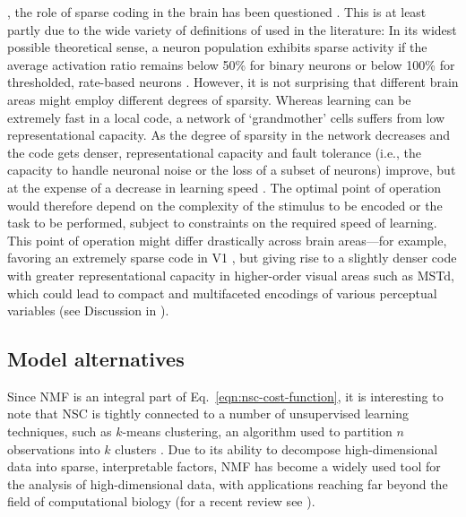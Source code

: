 , the role of sparse coding in the brain has been questioned
\cite{SpanneJorntell2015,BarthPoulet2012}.
This is at least partly due to the wide variety of definitions of 
used in the literature:
In its widest possible theoretical sense,
a neuron population exhibits sparse activity if the average activation ratio
remains below 50\% for binary neurons 
or below 100\% for thresholded,
rate-based neurons \cite{SpanneJorntell2015}.
However, it is not surprising that different brain areas might employ
different degrees of sparsity.
Whereas learning can be extremely fast in a local code,
a network of `grandmother' cells suffers from low representational capacity.
As the degree of sparsity in the network decreases and the code gets denser,
representational capacity and fault tolerance 
(i.e., the capacity to handle neuronal noise or the loss of a subset of neurons)
improve,
but at the expense of a decrease in learning speed
\cite{Foldiak1990,SpanneJorntell2015}.
The optimal point of operation would therefore depend on the complexity of
the stimulus to be encoded or the task to be performed,
subject to constraints on the required speed of learning.
This point of operation might differ drastically across brain areas---for example,
favoring an extremely sparse code in \ac{V1}
\cite{OlshausenField1996},
but giving rise to a slightly denser code with 
greater representational capacity in higher-order visual areas
such as \ac{MSTd}, 
which could lead to compact and multifaceted encodings
of various perceptual variables
(see Discussion in \cite{Beyeler2016}).


\subsection*{Model alternatives}

Since \ac{NMF} is an integral part 
of Eq.~\ref{eqn:nsc-cost-function},
it is interesting to note that \ac{NSC} is tightly connected
to a number of unsupervised learning techniques,
such as $k$-means clustering,
an algorithm used to partition
$n$ observations into $k$ clusters
\cite{Ding2005}.
Due to its ability to decompose high-dimensional data into
sparse, interpretable factors, \ac{NMF} has become a 
widely used tool for the analysis of high-dimensional data,
with applications reaching far beyond
the field of computational biology
(for a recent review see \cite{Gillis2014}).

